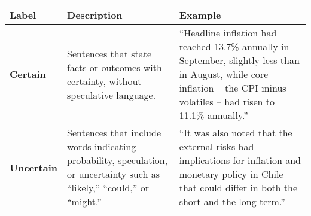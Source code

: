 \begin{table*}
    \caption{}
    \vspace{1em}
    \begin{tabular}{p{}p{}p{}}
    \toprule
    \textbf{Label} & \textbf{Description} & \textbf{Example}\\
    \midrule
    \textbf{Certain} & Sentences that state facts or outcomes with certainty, without speculative language. & “Headline inflation had reached 13.7\% annually in September, slightly less than in August, while core inflation -- the CPI minus volatiles -- had risen to 11.1\% annually.” \\
    \midrule
    \textbf{Uncertain} & Sentences that include words indicating probability, speculation, or uncertainty such as ``likely,'' ``could,'' or ``might.'' & “It was also noted that the external risks had implications for inflation and monetary policy in Chile that could differ in both the short and the long term.” \\
    \bottomrule
    \end{tabular}
    \label{tb:cboc_certainty_guide}
    \end{table*}
    